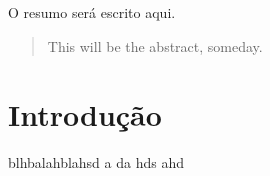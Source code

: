 \documentclass[brazil,pagestart=firstchapter]{abnt}
\begin{document}
\begin{resumo}
O resumo será escrito aqui.
\end{resumo}

\begin{abstract}
This will be the abstract, someday.
\end{abstract}





\listoffigures



\tableofcontents{}


\chapter{Introdução\label{cap:introducao}}

blhbalahblahsd
a
da
hds
ahd
\end{document}
